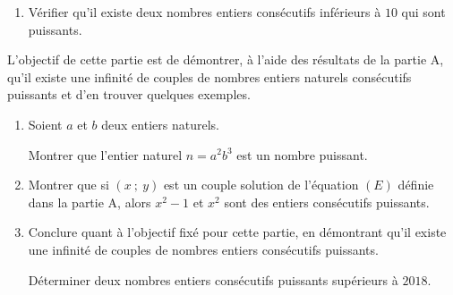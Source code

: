 \documentclass{cornouaille}
\begin{document}
\begin{exercice}[Spécialité][5]
\medskip

\begin{enumerate}
\item Vérifier qu'il existe deux nombres entiers consécutifs inférieurs à $10$ qui sont puissants.
\end{enumerate}
\medskip

L'objectif de cette partie est de démontrer, à l'aide des résultats de la partie A, qu'il existe une infinité de couples de nombres entiers naturels consécutifs puissants et d'en trouver quelques exemples.

\medskip

\begin{enumerate}
\item  Soient $a$ et $b$ deux entiers naturels.

Montrer que l'entier naturel $n = a^2 b^3$ est un nombre puissant.
\item  Montrer que si $(x~;~y)$ est un couple solution de l'équation $(E)$ définie dans la partie A, alors $x^2 - 1$ et $x^2$ sont des entiers consécutifs puissants.
\item  Conclure quant à l'objectif fixé pour cette partie, en démontrant qu'il existe une infinité de couples de nombres entiers consécutifs puissants.

Déterminer deux nombres entiers consécutifs puissants supérieurs à $2018$.
\end{enumerate}
\end{exercice}
\end{document}
